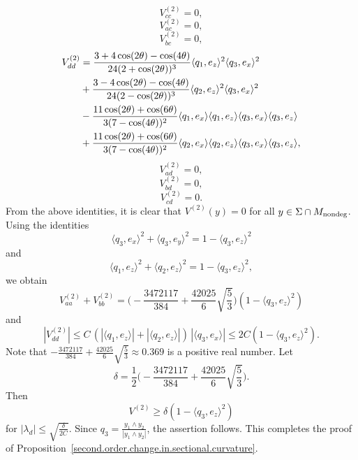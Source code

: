 \documentclass[11pt]{amsart}
\theoremstyle{definition}
\begin{document}
\begin{equation}\label{V2cc.value}
V^{(2)}_{cc}=0,  
\end{equation}
\begin{equation}\label{V2ac.value}
V^{(2)}_{ac}=0,  
\end{equation}
\begin{equation}\label{V2bc.value}
V^{(2)}_{bc}=0,  
\end{equation}
\begin{align}\label{V2dd.value}
V^{(2)}_{dd} 
&= \frac{3+4\cos(2\theta)-\cos(4\theta)}{24 (2+\cos(2\theta))^3}\langle q_1,e_z \rangle^2\langle q_3,e_x \rangle^2 \notag \\ 
&+\frac{3-4\cos(2\theta)-\cos(4\theta)}{24 (2-\cos(2\theta))^3}\langle q_2,e_z \rangle^2\langle q_3,e_x \rangle^2 \notag \\
&-\frac{11\cos(2\theta)+\cos(6\theta)}{3(7-\cos(4\theta))^2} \langle q_1,e_x \rangle\langle q_1,e_z\rangle \langle q_3,e_x \rangle\langle q_3,e_z \rangle \\
&+\frac{11\cos(2\theta)+\cos(6\theta)}{3(7-\cos(4\theta))^2} \langle q_2,e_x \rangle\langle q_2,e_z \rangle \langle q_3,e_x \rangle\langle q_3,e_z \rangle, \notag
\end{align}
\begin{equation}\label{V2ad.value}
V^{(2)}_{ad}=0,
\end{equation}
\begin{equation}\label{V2bd.value}
V^{(2)}_{bd}=0,
\end{equation}
\begin{equation}\label{V2cd.value}
V^{(2)}_{cd}=0.
\end{equation}
From the above identities, it is clear that $V^{(2)}(y)=0$ for all $y\in\Sigma\cap M_{\text{\rm nondeg}}$. Using the identities 
\[\langle q_3,e_x \rangle^2+\langle q_3,e_y \rangle^2 = 1-\langle q_3,e_z \rangle^2\] 
and 
\[\langle q_1,e_z \rangle^2+\langle q_2,e_z \rangle^2 = 1-\langle q_3,e_z \rangle^2,\] 
we obtain 
\[V^{(2)}_{aa} + V^{(2)}_{bb} = \Big ( -\frac{3472117}{384}+\frac{42025}{6}\sqrt{\frac{5}{3}} \Big ) (1-\langle q_3,e_z \rangle^2)\] 
and 
\[|V^{(2)}_{dd}| \leq C \, (|\langle q_1,e_z \rangle| + |\langle q_2,e_z \rangle|) \, |\langle q_3,e_x \rangle| \leq 2C (1-\langle q_3,e_z \rangle^2).\] 
Note that $-\frac{3472117}{384}+\frac{42025}{6}\sqrt{\frac{5}{3}}\approx 0.369$ is a positive real number. Let 
\[\delta=\frac{1}{2} \Big ( -\frac{3472117}{384}+\frac{42025}{6}\sqrt{\frac{5}{3}} \Big ).\]
Then 
\[V^{(2)} \geq \delta (1 - \langle q_3,e_z \rangle^2)\] 
for $|\lambda_d| \leq \sqrt{\frac{\delta}{2C}}$. Since $q_3 = \frac{y_1 \wedge y_2}{|y_1 \wedge y_2|}$, the assertion follows. This completes the proof of Proposition~\ref{second.order.change.in.sectional.curvature}. \\
\end{document}
